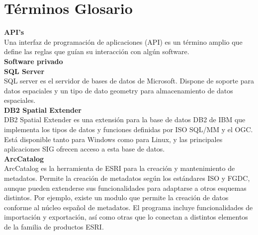 \documentclass[12pt]{report}
\begin{document}
{{{{{{{{{{{{{{{\newpage


				\chapter*{Términos Glosario}
				{\bf{API's}}\\
			Una interfaz de programación de aplicaciones (API) es un término amplio que define 
			las reglas que guían su interacción con algún software.   \\
				
			
			
				
				{\bf{Software privado}}\\ 
				
				
				{\bf{SQL Server}}\\
				SQL server es el servidor de bases de datos de Microsoft. Dispone de soporte para datos espaciales y un tipo de dato geometry para almacenamiento de datos espaciales.\\
				
				{\bf{DB2 Spatial Extender}}\\
				DB2 Spatial Extender es una extensión para la base de datos DB2 de IBM que implementa los tipos de datos y funciones definidas por ISO SQL/MM y el OGC. Está disponible tanto para Windows como para Linux, y las principales aplicaciones SIG ofrecen acceso a esta base de datos.\\
				
				{\bf{ArcCatalog}}\\
				ArcCatalog es la herramienta de ESRI para la creación y mantenimiento de metadatos. Permite la creación de metadatos según los estándares ISO y FGDC, aunque pueden extenderse sus funcionalidades para adaptarse a otros esquemas distintos. Por ejemplo, existe un modulo que permite la creación de datos conforme al núcleo español de metadatos. El programa incluye funcionalidades de importación y exportación, así como otras que lo conectan a distintos elementos de la familia de productos ESRI.\\
				
}}}}}}}}}}}}}}}
\end{document}
